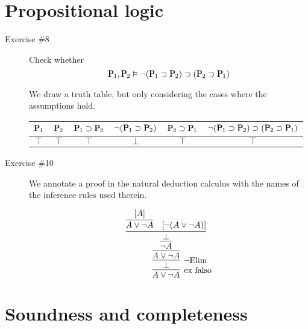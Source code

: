 \documentclass[11pt,letterpaper]{article}
\renewcommand{\implies}{\supset}
\begin{document}
\section{Propositional logic}

\begin{description}
  \item[Exercise \#8]
    Check whether
    \begin{equation*}
      \mathqd{P}_1, \mathqd{P}_2
      \entails
      \neg(\mathqd{P}_1 \implies \mathqd{P}_2)
      \implies
      (\mathqd{P}_2 \implies \mathqd{P}_1)
    \end{equation*}

    We draw a truth table, but only considering the cases where the assumptions
    hold.

    \begin{center}
      \begin{tabular}{cc|cccc}
        $\mathqd{P}_1$ &
        $\mathqd{P}_2$ &
        $\mathqd{P}_1 \implies \mathqd{P}_2$ &
        $\neg(\mathqd{P}_1 \implies \mathqd{P}_2)$ &
        $\mathqd{P}_2 \implies \mathqd{P}_1$ &
        $\neg(\mathqd{P}_1 \implies \mathqd{P}_2)
        \implies
        (\mathqd{P}_2 \implies \mathqd{P}_1)$ \\
        \hline
        $\top$ & $\top$ & $\top$ & $\bot$ & $\top$ & $\top$
      \end{tabular}
    \end{center}

  \item[Exercise \#10]
    We annotate a proof in the natural deduction calculus with the names of the
    inference rules used therein.

    \begin{equation*}
      \infer[\text{ex falso}]{
        A \lor \neg A
      }{
        \infer[\neg\text{Elim}]{\bot}{
          \infer{A \lor \neg A}{
            \infer{\neg A}{
              \infer{\bot}{
                \infer{A \lor \neg A}{
                  [A]
                }
                &
                [\neg(A \lor \neg A)]
              }
            }
          }
        }
      }
    \end{equation*}
\end{description}

\section{Soundness and completeness}
\end{document}
